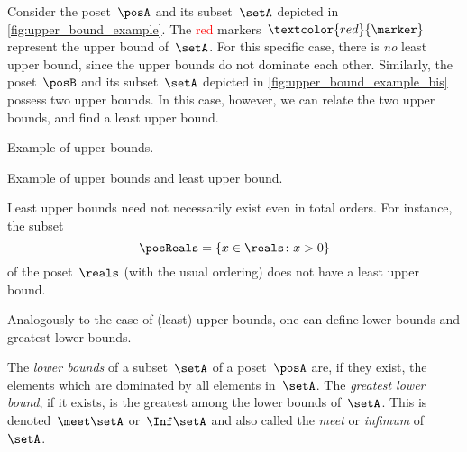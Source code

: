 \begin{example}
    Consider the poset~$\posA$ and its subset~$\setA$ depicted in \cref{fig:upper_bound_example}.
    The \textcolor{red}{red} markers~$\textcolor{red}{\marker}$ represent the upper bound of~$\setA$.
    For this specific case, there is \emph{no} least upper bound, since the upper bounds do not dominate each other.
    Similarly, the poset~$\posB$ and its subset~$\setA$ depicted in \cref{fig:upper_bound_example_bis} possess two upper bounds.
    In this case, however, we can relate the two upper bounds, and find a least upper bound.

    \begin{marginfigure}
        \centering
        \caption{Example of upper bounds. }
        \label{fig:upper_bound_example}
    \end{marginfigure}

    \begin{marginfigure}
        \centering

        \caption{Example of upper bounds and least upper bound. }
        \label{fig:upper_bound_example_bis}
    \end{marginfigure}
\end{example}

\begin{example}
    Least upper bounds need not necessarily exist even in total orders.
    For instance, the subset
    \begin{equation*}
        \posReals = \{x\in \reals \colon x>0\}
    \end{equation*}
    of the poset~$\reals$ (with the usual ordering) does not have a least upper bound.
\end{example}

Analogously to the case of (least) upper bounds, one can define lower bounds and greatest lower bounds.

\begin{ctdefinition}
    \label{def:greatest-lower-bound}
    The \emph{lower bounds} of a subset~$\setA$ of a poset~$\posA$ are, if they exist, the elements which are dominated by all elements in~$\setA$.
    The \emph{greatest lower bound}, if it exists, is the greatest among the lower bounds of~$\setA$.
    This is denoted~$\meet \setA$ or~$\Inf \setA$ and also called the \emph{meet} or \emph{infimum} of~$\setA$.
\end{ctdefinition}

